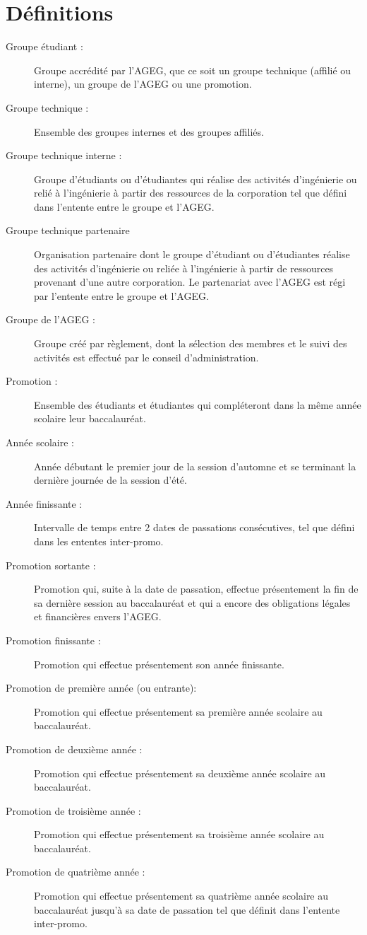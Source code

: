 \chapter*{Définitions}
\begin{description}
\item[Groupe étudiant :]{Groupe accrédité par l'AGEG, que ce soit un groupe technique (affilié ou interne), un groupe de l'AGEG ou une promotion.}
\item[Groupe technique :]{Ensemble des groupes internes et des groupes affiliés.}
\item[Groupe technique interne :]{Groupe d'étudiants ou d'étudiantes qui réalise des activités d'ingénierie ou relié à l'ingénierie à partir des ressources de la corporation tel que défini dans l'entente entre le groupe et l'AGEG.}
\item[Groupe technique partenaire]{Organisation  partenaire dont  le  groupe  d’étudiant ou d'étudiantes  réalise  des  activités  d’ingénierie  ou  reliée  à l’ingénierie  à  partir  de  ressources  provenant  d’une  autre  corporation. Le partenariat  avec  l’AGEG  est  régi  par  l’entente  entre  le  groupe  et l’AGEG.}
\item[Groupe de l’AGEG :]{Groupe créé par règlement, dont la sélection des membres et le suivi des activités est effectué par le conseil d'administration.}

\end{description}
\vspace{5mm}
\begin{description}
\item[Promotion :]{Ensemble des étudiants et étudiantes qui compléteront dans la même année scolaire leur baccalauréat.}
\item[Année scolaire :]{Année débutant le premier jour de la session d'automne et se terminant la dernière journée de la session d'été.}
\item[Année finissante :]{Intervalle de temps entre 2 dates de passations consécutives, tel que défini dans les ententes inter-promo.}
\item[Promotion sortante :]{Promotion qui, suite à la date de passation, effectue présentement la fin de sa dernière session au baccalauréat et qui a encore des obligations légales et financières envers l’AGEG.}
\item[Promotion finissante :]{Promotion qui effectue présentement son année finissante.}
\item[Promotion  de première année (ou entrante):]{Promotion qui effectue présentement sa première année scolaire au baccalauréat.}
\item[Promotion de deuxième année :]{Promotion qui effectue présentement sa deuxième année scolaire au baccalauréat.}
\item[Promotion de troisième année :]{Promotion qui effectue présentement sa troisième année scolaire au baccalauréat.}
\item[Promotion de quatrième année :]{Promotion qui effectue présentement sa quatrième année scolaire au baccalauréat jusqu'à sa date de passation tel que définit dans l'entente inter-promo.}
\end{description}
